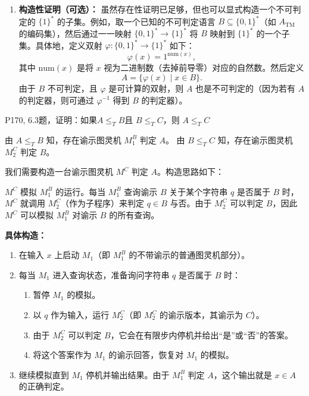 \documentclass[11pt,addpoints,answers]{exam}
\begin{document}
\begin{questions}
\begin{solution}
\begin{enumerate}
        \item \textbf{构造性证明（可选）：}
        虽然存在性证明已足够，但也可以显式构造一个不可判定的 $\{1\}^*$ 的子集。例如，取一个已知的不可判定语言 $B \subseteq \{0,1\}^*$（如 $A_{\text{TM}}$ 的编码集），然后通过一一映射 $\{0,1\}^* \to \{1\}^*$ 将 $B$ 映射到 $\{1\}^*$ 的一个子集。具体地，定义双射 $\varphi: \{0,1\}^* \to \{1\}^*$ 如下：
        \[
        \varphi(x) = 1^{\mathrm{num}(x)},
        \]
        其中 $\mathrm{num}(x)$ 是将 $x$ 视为二进制数（去掉前导零）对应的自然数。然后定义
        \[
        A = \{ \varphi(x) \mid x \in B \}.
        \]
        由于 $B$ 不可判定，且 $\varphi$ 是可计算的双射，则 $A$ 也是不可判定的（因为若有 $A$ 的判定器，则可通过 $\varphi^{-1}$ 得到 $B$ 的判定器）。
    \end{enumerate}
\end{solution}

\question P170, 6.3题，证明：如果$A\leq_T B $且 $B\leq_T C$，则 $ A\leq_T C$
\begin{solution}
	由 $A \leq_T B$ 知，存在谕示图灵机 $M_1^B$ 判定 $A$。  
由 $B \leq_T C$ 知，存在谕示图灵机 $M_2^C$ 判定 $B$。

我们需要构造一台谕示图灵机 $M^C$ 判定 $A$。构造思路如下：

$M^C$ 模拟 $M_1^B$ 的运行。每当 $M_1^B$ 查询谕示 $B$ 关于某个字符串 $q$ 是否属于 $B$ 时，$M^C$ 就调用 $M_2^C$（作为子程序）来判定 $q \in B$ 与否。由于 $M_2^C$ 可以判定 $B$，因此 $M^C$ 可以模拟 $M_1^B$ 对谕示 $B$ 的所有查询。

\noindent \textbf{具体构造：}
\begin{enumerate}
    \item 在输入 $x$ 上启动 $M_1$（即 $M_1^B$ 的不带谕示的普通图灵机部分）。
    \item 每当 $M_1$ 进入查询状态，准备询问字符串 $q$ 是否属于 $B$ 时：
        \begin{enumerate}
            \item 暂停 $M_1$ 的模拟。
            \item 以 $q$ 作为输入，运行 $M_2^C$（即 $M_2^C$ 的谕示版本，其谕示为 $C$）。
            \item 由于 $M_2^C$ 可以判定 $B$，它会在有限步内停机并给出“是”或“否”的答案。
            \item 将这个答案作为 $M_1$ 的谕示回答，恢复对 $M_1$ 的模拟。
        \end{enumerate}
    \item 继续模拟直到 $M_1$ 停机并输出结果。由于 $M_1^B$ 判定 $A$，这个输出就是 $x \in A$ 的正确判定。
\end{enumerate}


\end{solution}
\end{questions}
\end{document}
